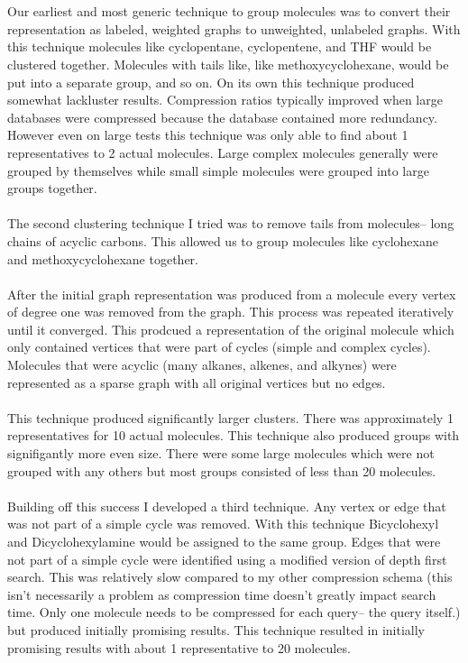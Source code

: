 \documentclass[DIV=calc, paper=a4, fontsize=12pt, twocolumn]{scrartcl}	 %
\begin{document}
\\\\
Our earliest and most generic technique to group molecules was to convert their representation as labeled, weighted graphs to unweighted, unlabeled graphs. With this technique molecules like cyclopentane, cyclopentene, and THF would be clustered together. Molecules with tails like, like methoxycyclohexane, would be put  into  a separate group, and so on. On its own this technique produced somewhat lackluster results. Compression ratios typically improved when large databases were compressed because the database contained more redundancy. However even on large tests this technique was only able to find about 1 representatives to 2 actual molecules. Large complex molecules generally were grouped by themselves while small simple molecules were grouped into large groups together.
\\\\
The second clustering technique I tried was to remove tails from molecules– long chains of acyclic carbons. This allowed us to group molecules like cyclohexane and methoxycyclohexane together.
\\\\
After the initial graph representation was produced from a molecule every vertex of degree one was removed from the graph. This process was repeated iteratively until it converged. This prodcued a representation of the original molecule which only contained vertices that were part of cycles (simple and complex cycles). Molecules that were acyclic (many alkanes, alkenes, and alkynes) were represented as a sparse graph with all original vertices but no edges.
\\\\
This technique produced significantly larger clusters. There was approximately 1 representatives for 10 actual molecules. This technique also produced groups with signifigantly more even size. There were some large molecules which were not grouped with any others but most groups consisted of less than 20 molecules. 
\\\\
Building off this success I developed a third technique. Any vertex or edge that was not part of a simple cycle was removed. With this technique Bicyclohexyl and Dicyclohexylamine would be assigned to the same group. Edges that were not part of a simple cycle were identified using a modified version of depth first search. This was relatively slow compared to my other compression schema (this isn't necessarily a problem as compression time doesn't greatly impact search time. Only one molecule needs to be compressed for each query– the query itself.) but produced initially promising results. This technique resulted in initially promising results with about 1 representative to 20 molecules.
\end{document}

